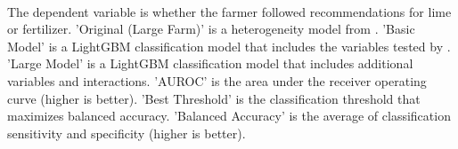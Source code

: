 \begin{table}[H] \centering
{}

\caption{Model Results Comparison: Lime}
\\ \parbox{0.79\linewidth}{\tiny The dependent variable is whether the farmer followed recommendations for lime or fertilizer. 'Original (Large Farm)' is a heterogeneity model from \textcite{fabregas_digital_2025}. 'Basic Model' is a LightGBM classification model that includes the variables tested by \textcite{fabregas_digital_2025}. 'Large Model'  is a LightGBM classification model that includes additional variables and interactions. 'AUROC' is the area under the receiver operating curve (higher is better). 'Best Threshold' is the classification threshold that maximizes balanced accuracy. 'Balanced Accuracy' is the average of classification sensitivity and specificity (higher is better).}
\end{table}
